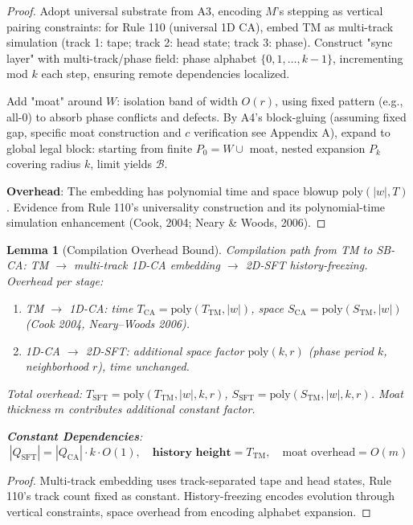 \documentclass[12pt]{article}
\theoremstyle{plain}
\newtheorem{lemma}[theorem]{Lemma}
\theoremstyle{definition}
\begin{document}
\begin{proof}
Adopt universal substrate from A3, encoding $M$'s stepping as vertical pairing constraints: for Rule 110 (universal 1D CA), embed TM as multi-track simulation (track 1: tape; track 2: head state; track 3: phase). Construct "sync layer" with multi-track/phase field: phase alphabet $\{0,1,\dots,k-1\}$, incrementing mod $k$ each step, ensuring remote dependencies localized.

Add "moat" around $W$: isolation band of width $O(r)$, using fixed pattern (e.g., all-0) to absorb phase conflicts and defects. By A4's block-gluing (assuming fixed gap, specific moat construction and $c$ verification see Appendix A), expand to global legal block: starting from finite $P_0 = W \cup$ moat, nested expansion $P_k$ covering radius $k$, limit yields $\mathcal{B}$.

\textbf{Overhead}: The embedding has polynomial time and space blowup $\mathrm{poly}(|w|,T)$. Evidence from Rule 110's universality construction\cite{cook2004} and its polynomial-time simulation enhancement\cite{neary2006} (Cook, 2004; Neary \& Woods, 2006).
\end{proof}

\begin{lemma}[Compilation Overhead Bound]
Compilation path from TM to SB-CA: TM $\to$ multi-track 1D-CA embedding $\to$ 2D-SFT history-freezing. Overhead per stage:

\begin{enumerate}
\item TM $\to$ 1D-CA: time $T_{\text{CA}} = \mathrm{poly}(T_{\text{TM}}, |w|)$, space $S_{\text{CA}} = \mathrm{poly}(S_{\text{TM}}, |w|)$ (Cook 2004, Neary--Woods 2006).
\item 1D-CA $\to$ 2D-SFT: additional space factor $\mathrm{poly}(k, r)$ (phase period $k$, neighborhood $r$), time unchanged.
\end{enumerate}

Total overhead: $T_{\text{SFT}} = \mathrm{poly}(T_{\text{TM}}, |w|, k, r)$, $S_{\text{SFT}} = \mathrm{poly}(S_{\text{TM}}, |w|, k, r)$. Moat thickness $m$ contributes additional constant factor.

\textbf{Constant Dependencies}:
\[
|Q_{\text{SFT}}| = |Q_{\text{CA}}| \cdot k \cdot O(1),\quad \textbf{history height} = T_{\text{TM}},\quad \text{moat overhead} = O(m)
\]
\end{lemma}

\begin{proof}
Multi-track embedding uses track-separated tape and head states, Rule 110's track count fixed as constant. History-freezing encodes evolution through vertical constraints, space overhead from encoding alphabet expansion.
\end{proof}
\end{document}
